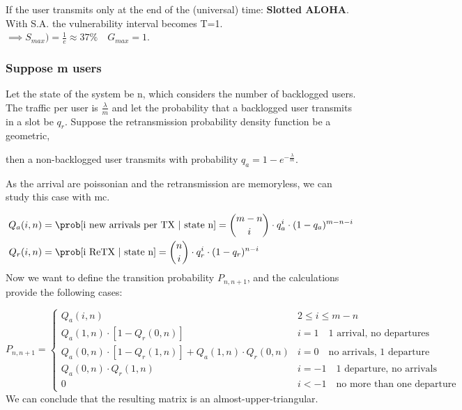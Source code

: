 If the user transmits only at the end of the (universal) time: \textbf{Slotted ALOHA}.
With S.A. the vulnerability interval becomes T=1. $\implies S_{max})=\frac{1}{e} \approx 37\% \quad G_{max} = 1$.

\subsubsection{Suppose m users}
Let the state of the system be n, which considers the number of backlogged users.
The traffic per user is $\frac{\lambda}{m}$ and let the probability that a backlogged
user transmits in a slot be $q_r$. Suppose the retransmission probability density function be a geometric,

then a non-backlogged user transmits with probability $q_a = 1-e^{-\frac{\lambda}{m}}$.

As the arrival are poissonian and the retransmission are memoryless, we can study this case with \gls{mc}.

\begin{equation}\begin{split}
  Q_a(i,n) &= \prob[\text{i new arrivals per TX | state n}] = \binom{m-n}{i} \cdot q_a^i \cdot (1-q_a)^{m-n-i} \\
  Q_r(i,n) &= \prob[\text{i ReTX | state n}] = \binom{n}{i} \cdot q_r^i \cdot (1-q_r)^{n-i} \\
\end{split}\end{equation}
Now we want to define the transition probability $P_{n,n+1}$, and the calculations provide the following cases:

\begin{equation}
  P_{n,n+1} = \begin{cases}
    Q_a(i,n) & 2 \le i \le m-n \\
    Q_a(1,n) \cdot [1-Q_r(0,n)] & i=1 \quad \text{1 arrival, no departures}\\
    Q_a(0,n) \cdot [1-Q_r(1,n)] + Q_a(1,n)\cdot Q_r(0,n) & i=0 \quad \text{no arrivals, 1 departure (successful reTX) or 1 arrival successfully transmitted }\\
    Q_a(0,n)\cdot Q_r(1,n) & i = -1 \quad \text{1 departure, no arrivals}\\
    0 & i < -1 \quad \text{no more than one departure}
  \end{cases}
\end{equation}
We can conclude that the resulting matrix is an almost-upper-triangular.

